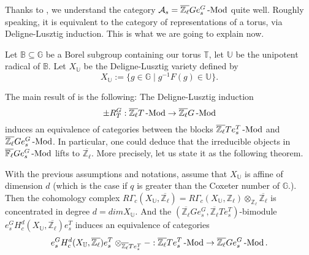 		
		Thanks to \cite{broue1990isometries}, we understand the category $\mathcal{A}_s=\overline{\mathbb{Z}_\ell}Ge_s^G\operatorname{-Mod}$ quite well. Roughly speaking, it is equivalent to the category of representations of a torus, via Deligne-Lusztig induction. This is what we are going to explain now.
		
		Let $\mathbb{B} \subseteq \mathbb{G}$ be a Borel subgroup containing our torus $\mathbb{T}$, let $\mathbb{U}$ be the unipotent radical of $\mathbb{B}$. Let $X_{\mathbb{U}}$ be the Deligne-Lusztig variety defined by
		$$X_{\mathbb{U}}:=\{g \in \mathbb{G} \;|\; g^{-1}F(g) \in \mathbb{U}\}.$$
		
		The main result of \cite{broue1990isometries} is the following: The Deligne-Lusztig induction 
		$$\pm R_T^G: \overline{\mathbb{Z}_\ell}T\operatorname{-Mod} \to \overline{\mathbb{Z}_\ell}G\operatorname{-Mod}$$ induces an equivalence of categories between the blocks $\overline{\mathbb{Z}_\ell}Te_s^T\operatorname{-Mod}$ and $\overline{\mathbb{Z}_\ell}Ge_s^G\operatorname{-Mod}$. In particular, one could deduce that the irreducible objects in $\overline{\mathbb{F}_\ell}Ge_s^G\operatorname{-Mod}$ lifts to $\overline{\mathbb{Z}_\ell}$. More precisely, let us state it as the following theorem.
		
		\begin{theorem}\label{Thm Broué}
			With the previous assumptions and notations, assume that $X_{\mathbb{U}}$ is affine of dimension $d$ (which is the case if $q$ is greater than the Coxeter number of $\mathbb{G}$.). Then the cohomology complex $R\Gamma_c(X_{\mathbb{U}}, \overline{\mathbb{Z}_\ell})=R\Gamma_c(X_{\mathbb{U}}, {\mathbb{Z}_\ell}) \otimes_{\mathbb{Z}_\ell}$$\overline{\mathbb{Z}_\ell}$ is concentrated in degree $d=dimX_{\mathbb{U}}$. And the $(\overline{\mathbb{Z}_\ell}Ge_s^G, \overline{\mathbb{Z}_\ell}Te_s^T)$-bimodule $e_s^GH_c^d(X_{\mathbb{U}}, \overline{\mathbb{Z}_\ell})e_s^T$ induces an equivalence of categories
			$$e_s^GH_c^d(X_{\mathbb{U}}, \overline{\mathbb{Z}_\ell})e_s^T \otimes_{\overline{\mathbb{Z}_\ell}Te_s^T}-: \overline{\mathbb{Z}_\ell}Te_s^T\operatorname{-Mod} \to \overline{\mathbb{Z}_\ell}Ge_s^G\operatorname{-Mod}.$$
		\end{theorem}
		
